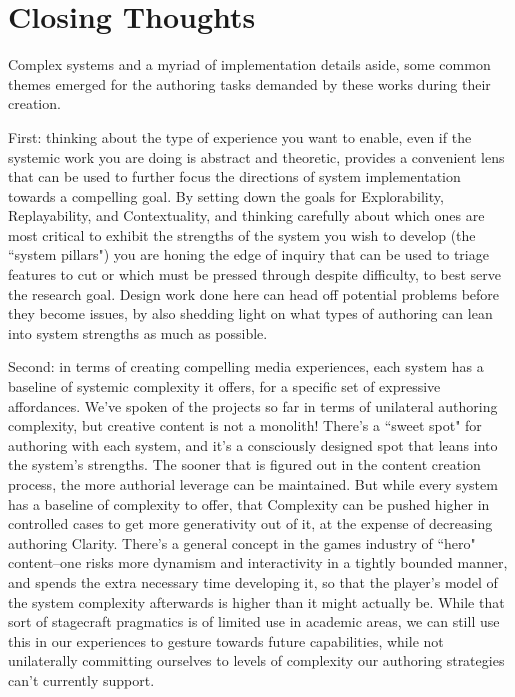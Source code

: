 \section{Closing Thoughts}

Complex systems and a myriad of implementation details aside, some common themes emerged for the authoring tasks demanded by these works during their creation.

First: thinking about the type of experience you want to enable, even if the systemic work you are doing is abstract and theoretic, provides a convenient lens that can be used to further focus the directions of system implementation towards a compelling goal. By setting down the goals for Explorability, Replayability, and Contextuality, and thinking carefully about which ones are most critical to exhibit the strengths of the system you wish to develop (the ``system pillars") you are honing the edge of inquiry that can be used to triage features to cut or which must be pressed through despite difficulty, to best serve the research goal. Design work done here can head off potential problems before they become issues, by also shedding light on what types of authoring can lean into system strengths as much as possible.

Second: in terms of creating compelling media experiences, each system has a baseline of systemic complexity it offers, for a specific set of expressive affordances. We've spoken of the projects so far in terms of unilateral authoring complexity, but creative content is not a monolith! There's a ``sweet spot" for authoring with each system, and it's a consciously designed spot that leans into the system's strengths. The sooner that is figured out in the content creation process, the more authorial leverage can be maintained. But while every system has a baseline of complexity to offer, that Complexity can be pushed higher in controlled cases to get more generativity out of it, at the expense of decreasing authoring Clarity. There's a general concept in the games industry of ``hero" content--one risks more dynamism and interactivity in a tightly bounded manner, and spends the extra necessary time developing it, so that the player's model of the system complexity afterwards is higher than it might actually be. While that sort of stagecraft pragmatics is of limited use in academic areas, we can still use this in our experiences to gesture towards future capabilities, while not unilaterally committing ourselves to levels of complexity our authoring strategies can't currently support.

